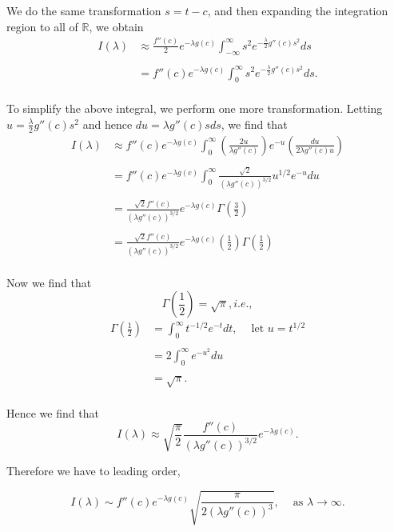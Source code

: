We do the same transformation $s = t-c$, and then expanding the integration region to all of $\mathbb{R}$, we obtain
\begin{align*}
I(\lambda) &\approx  \frac{f''(c)}{2} e^{-\lambda g(c) }  \int_{-\infty}^{\infty} s^2 e^{-\frac{\lambda}{2} g''(c) s^2 } ds\\ \\
	&= f''(c) e^{-\lambda g(c) } \int_0^{\infty} s^2 e^{-\frac{\lambda}{2} g''(c) s^2 } ds. \\ 
\end{align*}

To simplify the above integral, we perform one more transformation. Letting $u = \frac{\lambda}{2}g''(c) s^2$ and hence $du = \lambda g''(c) s ds$, we find that
\begin{align*}
I(\lambda) &\approx f''(c) e^{-\lambda g(c) } \int_0^{\infty} \left( \frac{2u}{\lambda g''(c) } \right) e^{-u} \left( \frac{du}{2\lambda g''(c) u} \right) \\ \\
	&= f''(c) e^{-\lambda g(c) } \int_{0}^{\infty} \frac{ \sqrt{2} }{ (\lambda g''(c) )^{3/2} } u^{1/2} e^{-u} du \\ \\
	&= \frac{ \sqrt{2} f''(c) }{ (\lambda g''(c) )^{3/2} } e^{-\lambda g(c) } \Gamma\left(\frac{3}{2}\right) \\ \\
	&= \frac{ \sqrt{2} f''(c) }{ (\lambda g''(c) )^{3/2} } e^{-\lambda g(c) } \left( \frac{1}{2} \right) \Gamma\left( \frac{1}{2} \right) \\ 
 \end{align*}
 
 Now we find that $$\Gamma\left( \frac{1}{2} \right) = \sqrt{ \pi }, i.e.,$$
\begin{align*}
\Gamma\left( \frac{1}{2} \right) &= \int_0^{\infty} t^{-1/2} e^{-t} dt, \ \ \ \ \mbox{ let } u=t^{1/2} \\ \\
	&= 2 \int_0^{\infty} e^{-u^2}  du \\ \\
	&= \sqrt{\pi}. \\
\end{align*} 
 
 Hence we find that 
 $$I(\lambda) \approx \sqrt{ \frac{\pi}{2} } \frac{ f''(c) }{ ( \lambda g''(c) )^{3/2} } e^{-\lambda g(c) }.$$
 
 Therefore we have to leading order,
 
 $$I(\lambda) \sim f''(c) e^{-\lambda g(c) } \sqrt{  \frac{\pi}{ 2 \left( \lambda g''(c) \right)^3   } }, \ \ \ \ \mbox{ as } \lambda\rightarrow\infty.$$
 
